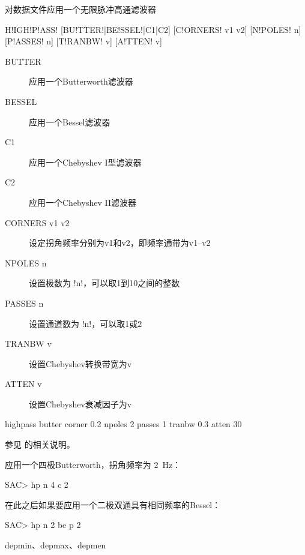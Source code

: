 \label{cmd:highpass}

对数据文件应用一个无限脉冲高通滤波器

\begin{SACSTX}
H!IGH!P!ASS! [BU!TTER!|BE!SSEL!|C1|C2] [C!ORNERS! v1 v2] [N!POLES! n] [P!ASSES! n]
    [T!RANBW! v] [A!TTEN! v]
\end{SACSTX}

\begin{description}
\item [BUTTER] 应用一个Butterworth滤波器
\item [BESSEL] 应用一个Bessel滤波器
\item [C1] 应用一个Chebyshev I型滤波器
\item [C2] 应用一个Chebyshev II滤波器
\item [CORNERS v1 v2] 设定拐角频率分别为v1和v2，即频率通带为v1--v2
\item [NPOLES n] 设置极数为 !n!，可以取1到10之间的整数
\item [PASSES n] 设置通道数为 !n!，可以取1或2
\item [TRANBW v] 设置Chebyshev转换带宽为v
\item [ATTEN v] 设置Chebyshev衰减因子为v
\end{description}

\begin{SACDFT}
highpass butter corner 0.2 npoles 2 passes 1 tranbw 0.3 atten 30
\end{SACDFT}

参见  的相关说明。

应用一个四极Butterworth，拐角频率为 \SI{2}{\Hz}：
\begin{SACCode}
SAC> hp n 4 c 2
\end{SACCode}

在此之后如果要应用一个二极双通具有相同频率的Bessel：
\begin{SACCode}
SAC> hp n 2 be p 2
\end{SACCode}

depmin、depmax、depmen
